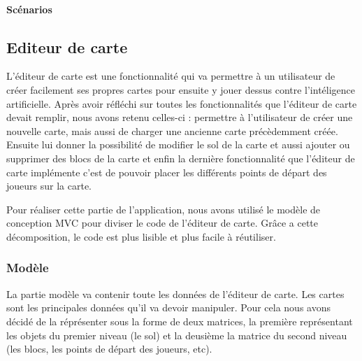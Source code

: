 		
		
						
	\paragraph{Scénarios}
	
	
\subsection{Editeur de carte}	

	L'éditeur de carte est une fonctionnalité qui va permettre à un utilisateur de créer facilement ses propres cartes pour ensuite y jouer dessus contre l'intéligence artificielle. Après avoir réfléchi sur toutes les fonctionnalités que l'éditeur de carte devait remplir, nous avons retenu celles-ci : permettre à l'utilisateur de créer une nouvelle carte, mais aussi de charger une ancienne carte précèdemment créée. Ensuite lui donner la possibilité de modifier le sol de la carte et aussi ajouter ou supprimer des blocs de la carte et enfin la dernière fonctionnalité que l'éditeur de carte implémente c'est de pouvoir placer les différents points de départ des joueurs sur la carte.
		
	Pour réaliser cette partie de l'application, nous avons utilisé le modèle de conception MVC pour diviser le code de l'éditeur de carte. Grâce a cette décomposition, le code est plus lisible et plus facile à réutiliser. 
			
	\subsubsection*{Modèle}
		La partie modèle va contenir toute les données de l'éditeur de carte. Les cartes sont les principales données qu'il va devoir manipuler. Pour cela nous avons décidé de la réprésenter sous la forme de deux matrices, la première représentant les objets du premier niveau (le sol) et la deusième la matrice du second niveau (les blocs, les points de départ des joueurs, etc).
			
			
